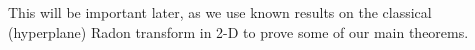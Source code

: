 \documentclass[a4paper,12pt]{amsart}
\numberwithin{equation}{section}
\theoremstyle{plain}
\numberwithin{theorem}{section}
\theoremstyle{definition}
\theoremstyle{remark}
\theoremstyle{remark}
\theoremstyle{remark}
\newcommand{\vx}{{\mathbf{x}}}
\newcommand{\vs}{\mathbf{s}}
\newcommand{\vd}{\mathbf{d}}
\newcommand{\seanc}[1]{\begin{quotation}\textbf{Sean's comment:\
}{\textit{#1}}\end{quotation}}
\begin{document}
This will be important later, as we use known results on the classical (hyperplane) Radon transform in 2-D to prove some of our main theorems.
\end{document}
